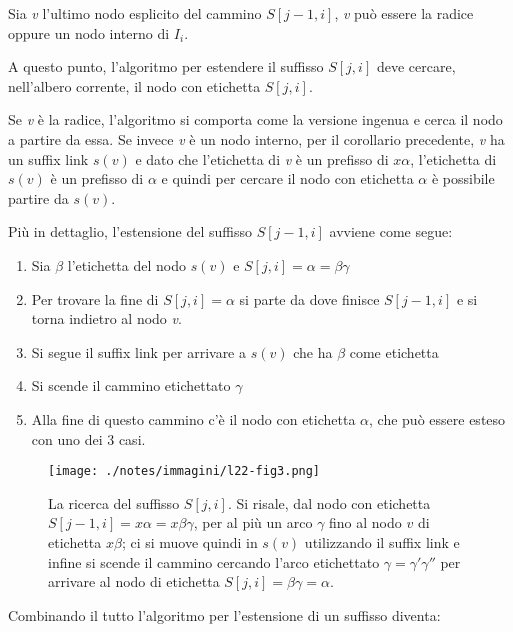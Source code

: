 Sia \textit{v} l'ultimo nodo esplicito del cammino $ S[j-1,i] $, \textit{v} può essere la radice oppure un nodo interno di $ I_i $.

A questo punto, l'algoritmo per estendere il suffisso $ S[j,i] $ deve cercare, nell'albero corrente, il nodo con etichetta $ S[j,i] $.

Se \textit{v} è la radice, l'algoritmo si comporta come la versione ingenua e cerca il nodo a partire da essa.
Se invece \textit{v} è un nodo interno, per il corollario precedente, \textit{v} ha un suffix link $ s(v) $ e dato che l'etichetta di \textit{v} è un prefisso di $ x\alpha $, l'etichetta di $ s(v) $ è un prefisso di $\alpha$ e quindi per cercare il nodo con etichetta $ \alpha $ è possibile partire da $ s(v) $.

Più in dettaglio, l'estensione del suffisso $ S[j-1,i] $ avviene come segue:

\begin{enumerate}
	\item Sia $\beta$ l'etichetta del nodo $ s(v) $ e $ S[j,i] = \alpha = \beta\gamma $
	\item Per trovare la fine di $ S[j,i] = \alpha $ si parte da dove finisce $ S[j-1,i] $ e si torna indietro al nodo \textit{v}.
	\item Si segue il suffix link per arrivare a $s(v)$ che ha $\beta$ come etichetta
	\item Si scende il cammino etichettato $\gamma$
	\item Alla fine di questo cammino c'è il nodo con etichetta $\alpha$, che può essere esteso con uno dei 3 casi.
\end{enumerate}

\begin{figure}[htbp]
	\centering
	\texttt{[image: ./notes/immagini/l22-fig3.png]}
	\caption{La ricerca del suffisso $ S[j,i] $. Si risale, dal nodo con etichetta $ S[j-1,i] = x\alpha = x\beta\gamma $, per al più un arco $\gamma$ fino al nodo $ v $ di etichetta $ x\beta $; ci si muove quindi in $ s(v) $ utilizzando il suffix link e infine si scende il cammino cercando l'arco etichettato $\gamma = \gamma'\gamma''$ per arrivare al nodo di etichetta $ S[j,i] = \beta\gamma =\alpha$.}
\end{figure}

Combinando il tutto l'algoritmo per l'estensione di un suffisso diventa:

